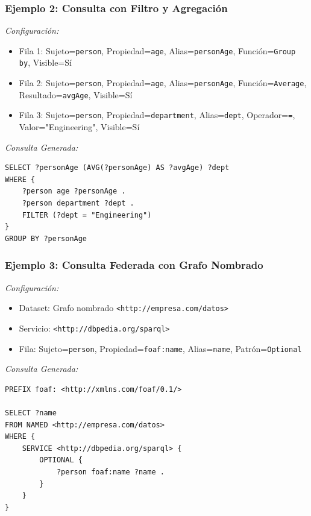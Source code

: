 \documentclass{article}
\begin{document}
\subsubsection{Ejemplo 2: Consulta con Filtro y Agregación}
\label{subsubsec:example-aggregation}

\textit{Configuración:}
\begin{itemize}
    \item Fila 1: Sujeto=\texttt{person}, Propiedad=\texttt{age}, Alias=\texttt{personAge}, 
          Función=\texttt{Group by}, Visible=Sí
    \item Fila 2: Sujeto=\texttt{person}, Propiedad=\texttt{age}, Alias=\texttt{personAge},
          Función=\texttt{Average}, Resultado=\texttt{avgAge}, Visible=Sí
    \item Fila 3: Sujeto=\texttt{person}, Propiedad=\texttt{department}, Alias=\texttt{dept},
          Operador=\texttt{=}, Valor="Engineering", Visible=Sí
\end{itemize}

\textit{Consulta Generada:}
\begin{verbatim}
SELECT ?personAge (AVG(?personAge) AS ?avgAge) ?dept
WHERE {
    ?person age ?personAge .
    ?person department ?dept .
    FILTER (?dept = "Engineering")
}
GROUP BY ?personAge
\end{verbatim}


\subsubsection{Ejemplo 3: Consulta Federada con Grafo Nombrado}
\label{subsubsec:example-federated}

\textit{Configuración:}
\begin{itemize}
    \item Dataset: Grafo nombrado \texttt{<http://empresa.com/datos>}
    \item Servicio: \texttt{<http://dbpedia.org/sparql>}
    \item Fila: Sujeto=\texttt{person}, Propiedad=\texttt{foaf:name}, 
          Alias=\texttt{name}, Patrón=\texttt{Optional}
\end{itemize}

\textit{Consulta Generada:}
\begin{verbatim}
PREFIX foaf: <http://xmlns.com/foaf/0.1/>

SELECT ?name
FROM NAMED <http://empresa.com/datos>
WHERE {
    SERVICE <http://dbpedia.org/sparql> {
        OPTIONAL {
            ?person foaf:name ?name .
        }
    }
}
\end{verbatim}
\end{document}
